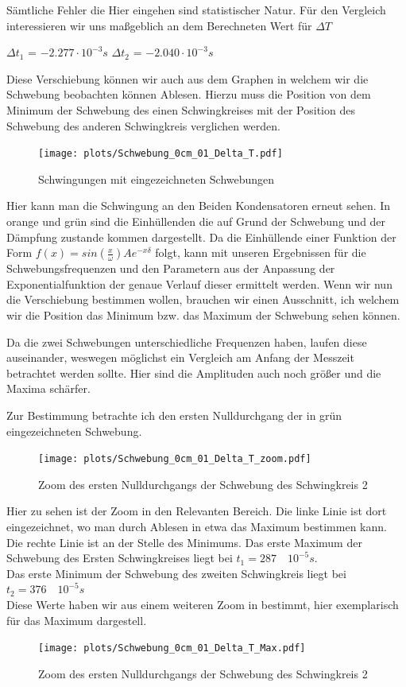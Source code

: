 \documentclass[twoside]{protokoll}
\begin{document}
Sämtliche Fehler die Hier eingehen sind statistischer Natur. Für den Vergleich interessieren wir uns maßgeblich an dem Berechneten Wert für $\Delta T$ 
\begin{center}
$\Delta t_1$ = $-2.277 \cdot 10^{-3}s  $ \qquad
$\Delta t_2$ = $-2.040 \cdot 10^{-3}s  $
\end{center}

Diese Verschiebung können wir auch aus dem Graphen in welchem wir die Schwebung beobachten können Ablesen. 
Hierzu muss die Position von dem Minimum der Schwebung des einen Schwingkreises mit der Position des Schwebung des anderen Schwingkreis verglichen werden.  

\begin{figure}[H]
    \centering
    \texttt{[image: plots/Schwebung\_0cm\_01\_Delta\_T.pdf]}
    \caption{Schwingungen mit eingezeichneten Schwebungen}
\end{figure}

Hier kann man die Schwingung an den Beiden Kondensatoren erneut sehen. 
In orange und grün sind die Einhüllenden die auf Grund der Schwebung und der Dämpfung zustande kommen dargestellt. 
Da die Einhüllende einer Funktion der Form $ f(x) = sin(\frac{x}{\omega})Ae^{-x\delta}$ folgt, kann mit unseren Ergebnissen für die Schwebungsfrequenzen und den Parametern aus der Anpassung der Exponentialfunktion der genaue Verlauf dieser ermittelt werden.
Wenn wir nun die Verschiebung bestimmen wollen, brauchen wir einen Ausschnitt, ich welchem wir die Position das Minimum bzw. das Maximum der Schwebung sehen können. 

Da die zwei Schwebungen unterschiedliche Frequenzen haben, laufen diese auseinander, weswegen möglichst ein Vergleich am Anfang der Messzeit betrachtet werden sollte.
Hier sind die Amplituden auch noch größer und die Maxima schärfer.

Zur Bestimmung betrachte ich den ersten Nulldurchgang der in grün eingezeichneten Schwebung. 

\begin{figure}[H]
    \centering
    \texttt{[image: plots/Schwebung\_0cm\_01\_Delta\_T\_zoom.pdf]}
    \caption{Zoom des ersten Nulldurchgangs der Schwebung des Schwingkreis 2}
\end{figure}

Hier zu sehen ist der Zoom in den Relevanten Bereich. Die linke Linie ist dort eingezeichnet, wo man durch Ablesen in etwa das Maximum bestimmen kann. Die rechte Linie ist an der Stelle des Minimums. Das erste Maximum der Schwebung des Ersten Schwingkreises liegt bei $ t_1 = 287 \quad 10^{-5}s$.\\
Das erste Minimum der Schwebung des zweiten Schwingkreis liegt bei $ t_2 = 376 \quad 10^{-5}s$\\
Diese Werte haben wir aus einem weiteren Zoom in bestimmt, hier exemplarisch für das Maximum dargestell.
\begin{figure}[H]
    \centering
    \texttt{[image: plots/Schwebung\_0cm\_01\_Delta\_T\_Max.pdf]}
    \caption{Zoom des ersten Nulldurchgangs der Schwebung des Schwingkreis 2}
\end{figure}
\end{document}
